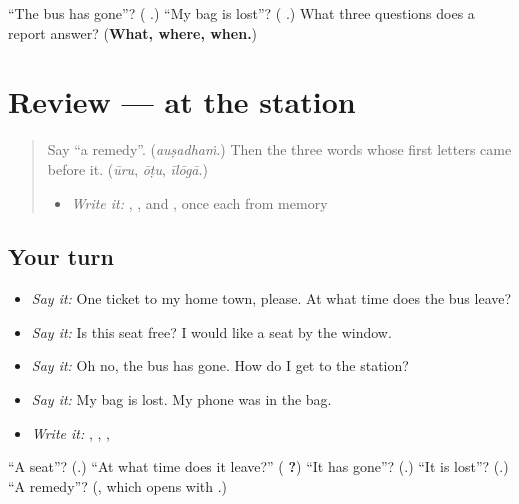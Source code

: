 \begin{tcolorbox}[breakable,colback=teal!4,colframe=teal!35!black,title={Before you move on}]
\textquotedblleft{}The bus has gone\textquotedblright{}? (\textbf{ }.) \textquotedblleft{}My bag is lost\textquotedblright{}? (\textbf{  }.) What three questions does a report answer? (\textbf{What, where, when.})
\end{tcolorbox}
\section[(review)]{Review — at the station}

\label{lesson:TE-R321-at-the-station}



\begin{quote}
Say \textquotedblleft{}a remedy\textquotedblright{}. (\emph{auṣadhaṁ}.) Then the three words whose first letters came before it. (\emph{ūru}, \emph{ōṭu}, \emph{īlōgā}.)

\begin{itemize}
\raggedright
  \item \emph{Write it:} \textbf{}, \textbf{}, \textbf{} and \textbf{}, once each from memory
\end{itemize}
\end{quote}

\subsection*{Your turn}
\begin{itemize}
\raggedright
  \item \emph{Say it:} One ticket to my home town, please. At what time does the bus leave?
  \item \emph{Say it:} Is this seat free? I would like a seat by the window.
  \item \emph{Say it:} Oh no, the bus has gone. How do I get to the station?
  \item \emph{Say it:} My bag is lost. My phone was in the bag.
  \item \emph{Write it:} \textbf{}, \textbf{}, \textbf{}, \textbf{}
\end{itemize}

\begin{tcolorbox}[breakable,colback=teal!4,colframe=teal!35!black,title={Before you move on}]
\textquotedblleft{}A seat\textquotedblright{}? (\textbf{}.) \textquotedblleft{}At what time does it leave?\textquotedblright{} (\textbf{  ?}) \textquotedblleft{}It has gone\textquotedblright{}? (\textbf{}.) \textquotedblleft{}It is lost\textquotedblright{}? (\textbf{}.) \textquotedblleft{}A remedy\textquotedblright{}? (\textbf{}, which opens with \textbf{}.)
\end{tcolorbox}
